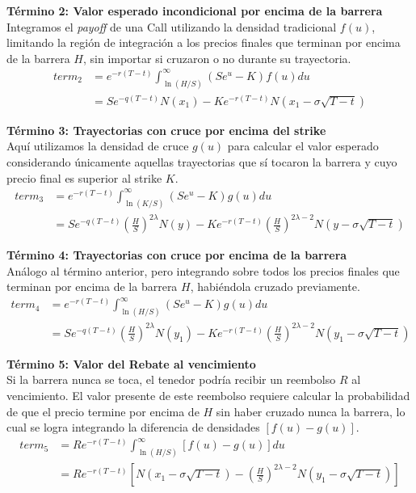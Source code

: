 \textbf{Término 2: Valor esperado incondicional por encima de la barrera}\\
Integramos el \textit{payoff} de una Call utilizando la densidad tradicional $f(u)$, limitando la región de integración a los precios finales que terminan por encima de la barrera $H$, sin importar si cruzaron o no durante su trayectoria.
\begin{align}
term_2 &= e^{-r(T-t)} \int_{\ln(H/S)}^{\infty} (S e^u - K) f(u) du \nonumber \\
       &= S e^{-q(T-t)} N(x_1) - K e^{-r(T-t)} N(x_1 - \sigma\sqrt{T-t})
\end{align}

\textbf{Término 3: Trayectorias con cruce por encima del strike}\\
Aquí utilizamos la densidad de cruce $g(u)$ para calcular el valor esperado considerando únicamente aquellas trayectorias que sí tocaron la barrera y cuyo precio final es superior al strike $K$.
\begin{align}
term_3 &= e^{-r(T-t)} \int_{\ln(K/S)}^{\infty} (S e^u - K) g(u) du \nonumber \\
       &= S e^{-q(T-t)} \left(\frac{H}{S}\right)^{2\lambda} N(y) - K e^{-r(T-t)}\left(\frac{H}{S}\right)^{2\lambda - 2} N(y - \sigma\sqrt{T-t})
\end{align}

\textbf{Término 4: Trayectorias con cruce por encima de la barrera}\\
Análogo al término anterior, pero integrando sobre todos los precios finales que terminan por encima de la barrera $H$, habiéndola cruzado previamente.
\begin{align}
term_4 &= e^{-r(T-t)} \int_{\ln(H/S)}^{\infty} (S e^u - K) g(u) du \nonumber \\
       &= S e^{-q(T-t)} \left(\frac{H}{S}\right)^{2\lambda} N(y_1) - K e^{-r(T-t)}\left(\frac{H}{S}\right)^{2\lambda - 2} N(y_1 - \sigma\sqrt{T-t})
\end{align}

\textbf{Término 5: Valor del Rebate al vencimiento}\\
Si la barrera nunca se toca, el tenedor podría recibir un reembolso $R$ al vencimiento. El valor presente de este reembolso requiere calcular la probabilidad de que el precio termine por encima de $H$ sin haber cruzado nunca la barrera, lo cual se logra integrando la diferencia de densidades $[f(u) - g(u)]$.
\begin{align}
term_5 &= R e^{-r(T-t)} \int_{\ln(H/S)}^{\infty} [f(u) - g(u)] du \nonumber \\
       &= R e^{-r(T-t)} \left[ N(x_1 - \sigma \sqrt{T-t}) - \left(\frac{H}{S}\right)^{2\lambda - 2} N(y_1 - \sigma\sqrt{T-t}) \right]
\end{align}

